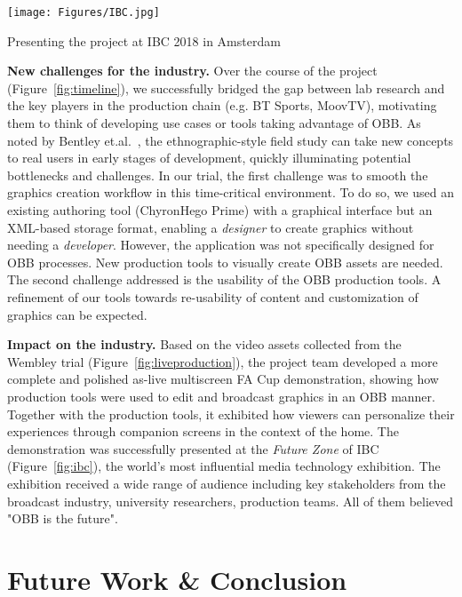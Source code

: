 \documentclass[sigchi-a, authorversion]{acmart}
\begin{document}
\begin{marginfigure}
    \hspace*{-1cm}
    \texttt{[image: Figures/IBC.jpg]}
    \caption{Presenting the project at IBC 2018 in Amsterdam}
    \label{fig:ibc}
\end{marginfigure}

\textbf{New challenges for the industry.} Over the course of the project (Figure~\ref{fig:timeline}), we successfully bridged the gap between lab research 
and the key players in the production chain (e.g. BT Sports, MoovTV),
motivating them to think of developing use cases or tools taking advantage of OBB. As noted by Bentley et.al.~\cite{bentley2009},
the ethnographic-style field study can take new concepts to real users in
early stages of development, quickly illuminating potential
bottlenecks and challenges. In our trial, the first challenge was to smooth the
graphics creation workflow in this time-critical environment. To
do so, we used an existing authoring tool (ChyronHego Prime) with a graphical
interface but an XML-based storage format, enabling a \textit{designer} to create
graphics without needing a \textit{developer}. However, the application was not specifically designed for OBB processes. New production tools to visually create OBB assets are needed. The second challenge addressed is the usability of the OBB production tools. A refinement of our tools towards re-usability of content and customization of graphics can be expected. 

\vspace{5pt}\noindent\textbf{Impact on the industry.} Based on the video assets
collected from the Wembley trial (Figure~\ref{fig:liveproduction}), the project team developed a more complete and
polished as-live multiscreen FA Cup demonstration, showing how production
tools were used to edit and broadcast graphics in an OBB manner. Together with
the production tools, it exhibited how viewers can personalize their experiences
through companion screens in the context of the home. The
demonstration was successfully presented at the \emph{Future Zone} of IBC (Figure~\ref{fig:ibc}), the world's
most influential media technology exhibition. The exhibition received a wide
range of audience including key stakeholders from the broadcast industry,
university researchers, production teams. All of them believed "OBB is the future".

\section{Future Work \& Conclusion}
\end{document}
